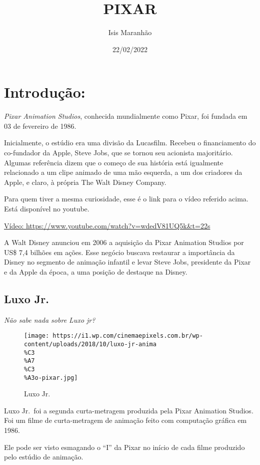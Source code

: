 \documentclass[
]{article}
\title{PIXAR}
\author{Isis Maranhão}
\date{22/02/2022}
\begin{document}
\maketitle

\hypertarget{introduuxe7uxe3o}{%
\section{\texorpdfstring{\textbf{Introdução}:}{Introdução:}}\label{introduuxe7uxe3o}}

\emph{Pixar Animation Studios}, conhecida mundialmente como Pixar, foi
fundada em 03 de fevereiro de 1986.

Inicialmente, o estúdio era uma divisão da Lucasfilm. Recebeu o
financiamento do co-fundador da Apple, Steve Jobs, que se tornou seu
acionista majoritário. Algumas referência dizem que o começo de sua
história está igualmente relacionado a um clipe animado de uma mão
esquerda, a um dos criadores da Apple, e claro, à própria The Walt
Disney Company.

Para quem tiver a mesma curiosidade, esse é o link para o vídeo referido
acima. Está disponível no youtube.

\href{https://www.youtube.com/watch?v=wdedV81UQ5k\&t=22s}{Vídeo:
https://www.youtube.com/watch?v=wdedV81UQ5k\&t=22s}

A Walt Disney anunciou em 2006 a aquisição da Pixar Animation Studios
por US\$ 7,4 bilhões em ações. Esse negócio buscava restaurar a
importância da Disney no segmento de animação infantil e levar Steve
Jobs, presidente da Pixar e da Apple da época, a uma posição de destaque
na Disney.

\hypertarget{luxo-jr.}{%
\subsection{Luxo Jr.}\label{luxo-jr.}}

\emph{Não sabe nada sobre Luxo jr?}

\begin{figure}
\centering
\texttt{[image: https://i1.wp.com/cinemaepixels.com.br/wp-content/uploads/2018/10/luxo-jr-anima\\\%C3\\\%A7\\\%C3\\\%A3o-pixar.jpg]}
\caption{Luxo Jr.}
\end{figure}

Luxo Jr.~foi a segunda curta-metragem produzida pela Pixar Animation
Studios. Foi um filme de curta-metragem de animação feito com computação
gráfica em 1986.

Ele pode ser visto esmagando o ``I'' da Pixar no início de cada filme
produzido pelo estúdio de animação.
\end{document}
